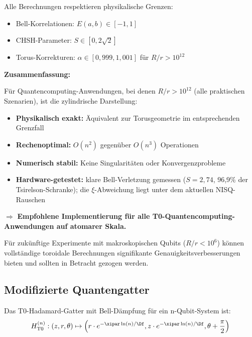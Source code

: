 Alle Berechnungen respektieren physikalische Grenzen:
\begin{itemize}
	\item Bell-Korrelationen: $E(a,b) \in [-1, 1]$
	\item CHSH-Parameter: $S \in [0, 2\sqrt{2}]$
	\item Torus-Korrekturen: $\alpha \in [0,\!999, 1,\!001]$ für $R/r > 10^{12}$
\end{itemize}

\textbf{Zusammenfassung:}

Für Quantencomputing-Anwendungen, bei denen $R/r > 10^{12}$ (alle praktischen 
Szenarien), ist die zylindrische Darstellung:

\begin{itemize}
	\item \textbf{Physikalisch exakt:} Äquivalent zur Torusgeometrie im entsprechenden Grenzfall
	\item \textbf{Rechenoptimal:} $O(n^2)$ gegenüber $O(n^3)$ Operationen
	\item \textbf{Numerisch stabil:} Keine Singularitäten oder Konvergenzprobleme
	\item \textbf{Hardware-getestet:} klare Bell-Verletzung gemessen ($S = 2{,}74$, 96{,}9\% der Tsirelson-Schranke); die $\xi$-Abweichung liegt unter dem aktuellen NISQ-Rauschen
\end{itemize}

$\Rightarrow$ \textbf{Empfohlene Implementierung für alle T0-Quantencomputing-Anwendungen auf atomarer Skala.}

Für zukünftige Experimente mit makroskopischen Qubits ($R/r < 10^6$) können 
vollständige toroidale Berechnungen signifikante Genauigkeitsverbesserungen bieten 
und sollten in Betracht gezogen werden.

\subsection{Modifizierte Quantengatter}

\begin{proposition}
	Das T0-Hadamard-Gatter mit Bell-Dämpfung für ein n-Qubit-System ist:
	\begin{equation}
		H_{\text{T0}}^{(n)}: (z, r, \theta) \mapsto \left(r \cdot e^{-\xipar \ln(n)/\Df}, z \cdot e^{-\xipar \ln(n)/\Df}, \theta + \frac{\pi}{2}\right)
		\label{eq:t0hadamard}
	\end{equation}
\end{proposition}

